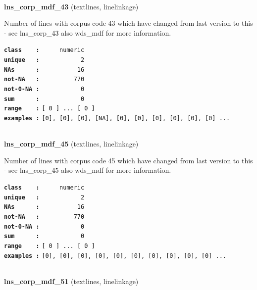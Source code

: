 \documentclass[]{article}
\begin{document}
~

\textbf{lns\_corp\_mdf\_43} (textlines, linelinkage)

Number of lines with corpus code 43 which have changed from last version
to this - see lns\_corp\_43 also wds\_mdf for more information.

\textbf{\texttt{class\ \ \ \ :}} \texttt{~~~~~numeric}\\
\textbf{\texttt{unique\ \ \ :}} \texttt{~~~~~~~~~~~2}\\
\textbf{\texttt{NAs\ \ \ \ \ \ :}} \texttt{~~~~~~~~~~16}\\
\textbf{\texttt{not-NA\ \ \ :}} \texttt{~~~~~~~~~770}\\
\textbf{\texttt{not-0-NA\ :}} \texttt{~~~~~~~~~~~0}\\
\textbf{\texttt{sum\ \ \ \ \ \ :}} \texttt{~~~~~~~~~~~0}\\
\textbf{\texttt{range\ \ \ \ :}}
\texttt{{[}\ 0\ {]}\ ...\ {[}\ 0\ {]}}\\
\textbf{\texttt{examples\ :}}
\texttt{{[}0{]},\ {[}0{]},\ {[}0{]},\ {[}NA{]},\ {[}0{]},\ {[}0{]},\ {[}0{]},\ {[}0{]},\ {[}0{]},\ {[}0{]}\ ...}\\

~

\textbf{lns\_corp\_mdf\_45} (textlines, linelinkage)

Number of lines with corpus code 45 which have changed from last version
to this - see lns\_corp\_45 also wds\_mdf for more information.

\textbf{\texttt{class\ \ \ \ :}} \texttt{~~~~~numeric}\\
\textbf{\texttt{unique\ \ \ :}} \texttt{~~~~~~~~~~~2}\\
\textbf{\texttt{NAs\ \ \ \ \ \ :}} \texttt{~~~~~~~~~~16}\\
\textbf{\texttt{not-NA\ \ \ :}} \texttt{~~~~~~~~~770}\\
\textbf{\texttt{not-0-NA\ :}} \texttt{~~~~~~~~~~~0}\\
\textbf{\texttt{sum\ \ \ \ \ \ :}} \texttt{~~~~~~~~~~~0}\\
\textbf{\texttt{range\ \ \ \ :}}
\texttt{{[}\ 0\ {]}\ ...\ {[}\ 0\ {]}}\\
\textbf{\texttt{examples\ :}}
\texttt{{[}0{]},\ {[}0{]},\ {[}0{]},\ {[}0{]},\ {[}0{]},\ {[}0{]},\ {[}0{]},\ {[}0{]},\ {[}0{]},\ {[}0{]}\ ...}\\

~

\textbf{lns\_corp\_mdf\_51} (textlines, linelinkage)
\end{document}
